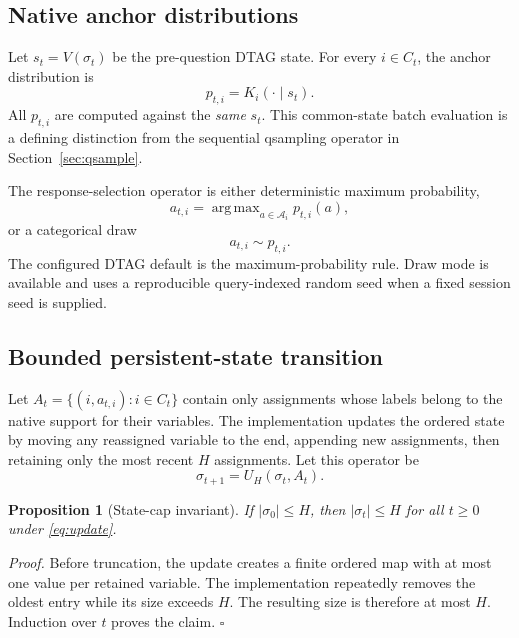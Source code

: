 \documentclass[journal]{IEEEtran}
\newtheorem{proposition}{Proposition}
\DeclareMathOperator{\argmax}{arg\,max}
\newcommand{\A}{\mathcal{A}}
\newcommand{\1}{\mathbf{1}}
\begin{document}
\subsection{Native anchor distributions}

Let $s_t=V(\sigma_t)$ be the pre-question DTAG state. For every $i\in C_t$, the anchor distribution is
\begin{equation}
  p_{t,i}=K_i(\cdot\mid s_t).
  \label{eq:anchor}
\end{equation}
All $p_{t,i}$ are computed against the \emph{same} $s_t$. This common-state batch evaluation is a defining distinction from the sequential qsampling operator in Section~\ref{sec:qsample}.

The response-selection operator is either deterministic maximum probability,
\begin{equation}
  a_{t,i}=\argmax_{a\in\A_i} p_{t,i}(a),
  \label{eq:argmax}
\end{equation}
or a categorical draw
\begin{equation}
  a_{t,i}\sim p_{t,i}.
  \label{eq:draw}
\end{equation}
The configured DTAG default is the maximum-probability rule. Draw mode is available and uses a reproducible query-indexed random seed when a fixed session seed is supplied.

\subsection{Bounded persistent-state transition}

Let $A_t=\{(i,a_{t,i}):i\in C_t\}$ contain only assignments whose labels belong to the native support for their variables. The implementation updates the ordered state by moving any reassigned variable to the end, appending new assignments, then retaining only the most recent $H$ assignments. Let this operator be
\begin{equation}
  \sigma_{t+1}=U_H(\sigma_t,A_t).
  \label{eq:update}
\end{equation}

\begin{proposition}[State-cap invariant]
If $|\sigma_0|\le H$, then $|\sigma_t|\le H$ for all $t\ge0$ under \eqref{eq:update}.
\end{proposition}

\emph{Proof.} Before truncation, the update creates a finite ordered map with at most one value per retained variable. The implementation repeatedly removes the oldest entry while its size exceeds $H$. The resulting size is therefore at most $H$. Induction over $t$ proves the claim. $\square$
\end{document}
